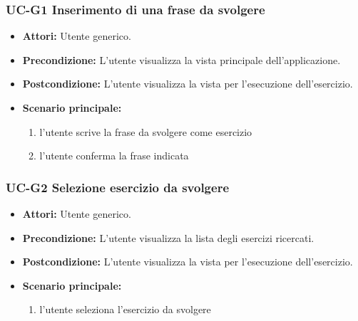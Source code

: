 	\subsubsection{UC-G1 Inserimento di una frase da svolgere}
	\begin{itemize}
		\item \textbf{Attori:} Utente generico.
		\item \textbf{Precondizione:} L'utente visualizza la vista principale dell'applicazione.
		\item \textbf{Postcondizione:} L'utente visualizza la vista per l'esecuzione dell'esercizio.
		\item \textbf{Scenario principale:}
		\begin{enumerate}
			\item l'utente scrive la frase da svolgere come esercizio
			\item l'utente conferma la frase indicata
		\end{enumerate}
	\end{itemize}

	\subsubsection{UC-G2 Selezione esercizio da svolgere}
	\begin{itemize}
			\item \textbf{Attori:} Utente generico.
			\item \textbf{Precondizione:} L'utente visualizza la lista degli esercizi ricercati.
			\item \textbf{Postcondizione:} L'utente visualizza la vista per l'esecuzione dell'esercizio.
			\item \textbf{Scenario principale:}
			\begin{enumerate}
					\item l'utente seleziona l'esercizio da svolgere
			\end{enumerate}
	\end{itemize}


